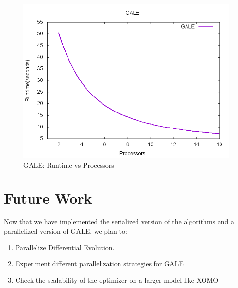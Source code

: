 \documentclass[conference]{IEEEtran}
\begin{document}
							\begin{figure}[h]
								\begin{mdframed}
									\includegraphics[width=\linewidth]{img/gale_processors}
								\end{mdframed}
								\caption{GALE: Runtime vs Processors}	
								\label{fig:gale_runtime}
							\end{figure}
							
							\section{Future Work}
							\label{future}
							
							Now that we have implemented the serialized version of the algorithms and a parallelized version of GALE, we plan to:
							\begin{enumerate}
								\item Parallelize Differential Evolution.
								\item Experiment different parallelization strategies for GALE
								\item Check the scalability of the optimizer on a larger model like XOMO\cite{menzies05xomo}
							\end{enumerate}
							\newpage
							
							
						
\end{document}
